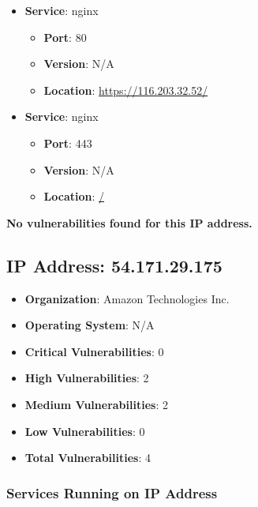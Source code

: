 \documentclass{article}
\begin{document}
\begin{itemize}
    
        \item \textbf{Service}: nginx
        \begin{itemize}
            \item \textbf{Port}: 80
            \item \textbf{Version}:  N/A 
            \item \textbf{Location}: \href{ https://116.203.32.52/ }{ https://116.203.32.52/ }
        \end{itemize}
    
        \item \textbf{Service}: nginx
        \begin{itemize}
            \item \textbf{Port}: 443
            \item \textbf{Version}:  N/A 
            \item \textbf{Location}: \href{ / }{ / }
        \end{itemize}
    
\end{itemize}


\textbf{No vulnerabilities found for this IP address.}




\clearpage



\subsection*{IP Address: 54.171.29.175}

\begin{itemize}
    \item \textbf{Organization}: Amazon Technologies Inc.
    \item \textbf{Operating System}:  N/A 
    \item \textbf{Critical Vulnerabilities}: 0
    \item \textbf{High Vulnerabilities}: 2
    \item \textbf{Medium Vulnerabilities}: 2
    \item \textbf{Low Vulnerabilities}: 0
    \item \textbf{Total Vulnerabilities}: 4
\end{itemize}

\subsubsection*{Services Running on IP Address}
\end{document}
